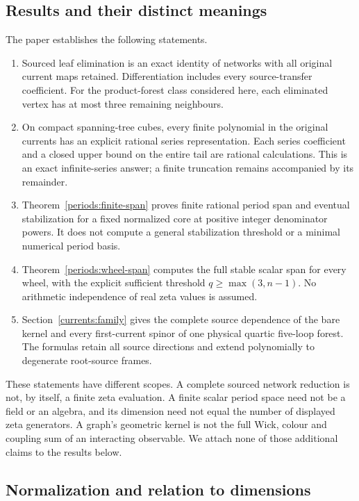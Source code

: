 \subsection{Results and their distinct meanings}

The paper establishes the following statements.
\begin{enumerate}
\item Sourced leaf elimination is an exact identity of networks with
all original current maps retained. Differentiation includes every
source-transfer coefficient. For the product-forest class considered
here, each eliminated vertex has at most three remaining neighbours.
\item On compact spanning-tree cubes, every finite polynomial in
the original currents has an explicit rational series representation.
Each series coefficient and a closed upper bound on the entire tail
are rational calculations. This is an exact infinite-series answer;
a finite truncation remains accompanied by its remainder.
\item Theorem~\ref{periods:finite-span} proves finite rational period
span and eventual stabilization for a fixed normalized core at
positive integer denominator powers. It does not compute a general
stabilization threshold or a minimal numerical period basis.
\item Theorem~\ref{periods:wheel-span} computes the full stable scalar
span for every wheel, with the explicit sufficient threshold
$q\ge\max(3,n-1)$. No arithmetic independence of real zeta values is
assumed.
\item Section~\ref{currents:family} gives the complete source dependence
of the bare kernel and every first-current spinor of one physical
quartic five-loop forest. The formulas retain all source directions
and extend polynomially to degenerate root-source frames.
\end{enumerate}

These statements have different scopes. A complete sourced network
reduction is not, by itself, a finite zeta evaluation. A finite scalar
period space need not be a field or an algebra, and its dimension need
not equal the number of displayed zeta generators. A graph's geometric
kernel is not the full Wick, colour and coupling sum of an interacting
observable. We attach none of those additional claims to the results
below.

\subsection{Normalization and relation to dimensions}

